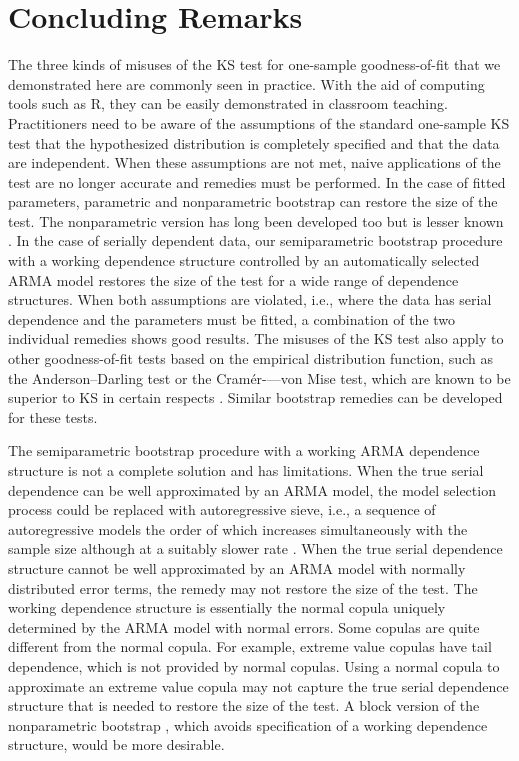 \documentclass[12pt, letterpaper]{article}
\begin{document}
\section{Concluding Remarks}
\label{sec:conclusion}

The three kinds of misuses of the KS test for one-sample goodness-of-fit that we
demonstrated here are commonly seen in practice. With the aid of computing tools
such as R, they can be easily demonstrated in classroom teaching. Practitioners
need to be aware of the assumptions of the standard one-sample KS test that the
hypothesized distribution is completely specified and that the data are
independent. When these assumptions are not met, naive applications of the test
are no longer accurate and remedies must be performed. In the
case of fitted parameters, parametric and nonparametric bootstrap can restore
the size of the test. The nonparametric version has long been developed too but
is lesser known \citep{babu2004goodness}. In the case of serially dependent data,
our semiparametric bootstrap procedure with a working dependence structure
controlled by an automatically selected ARMA model restores the size of the test
for a wide range of dependence structures.
When both assumptions are violated, i.e., where the data has serial 
dependence and the parameters must be fitted, a combination of the two
individual remedies shows good results. The misuses of the KS test also apply
to other goodness-of-fit tests based on the empirical distribution
function, such as the Anderson--Darling test or the Cramér-—von Mise test, which
are known to be superior to KS in certain respects \citep{stephens2017tests}.
Similar bootstrap remedies can be developed for these tests.


The semiparametric bootstrap procedure with a working ARMA dependence structure
is not a complete solution and has limitations. When the true serial dependence
can be well approximated by an ARMA model, the model selection process could be
replaced with
autoregressive sieve, i.e., a sequence of autoregressive models the order of 
which increases
simultaneously with the sample size although at a suitably slower rate 
\citep[e.g.,][]{psaradakis2017distance, psaradakis2020normality}.
When the true serial dependence
structure cannot be well approximated by an ARMA model with normally distributed
error terms, the remedy may not restore the size of the test. The working
dependence structure is essentially the normal copula uniquely determined by the
ARMA model with normal errors. Some copulas are quite different from the normal
copula. For example, extreme value copulas have tail dependence, which is not
provided by normal copulas.
Using a normal copula to approximate an extreme value copula may not capture the
true serial dependence structure that is needed to restore the size of the
test. A block version of the nonparametric bootstrap \citep{babu2004goodness},
which avoids specification of a working dependence structure, would be more
desirable.
\end{document}
